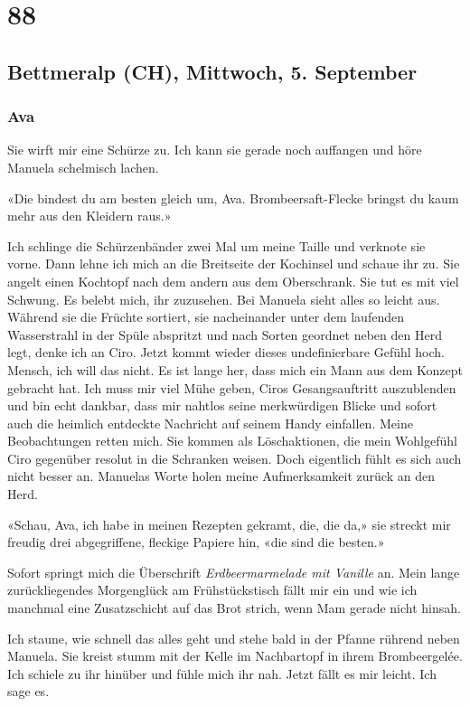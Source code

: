 \chapter{88}

\section{Bettmeralp (CH), Mittwoch, 5. 
September}

\subsection{Ava}

Sie wirft mir eine Schürze zu. Ich kann sie gerade noch auffangen und
höre Manuela schelmisch lachen.

«Die bindest du am besten gleich um, Ava. Brombeersaft-Flecke bringst du
kaum mehr aus den Kleidern raus.»

Ich schlinge die Schürzenbänder zwei Mal um meine Taille und verknote
sie vorne. Dann lehne ich mich an die Breitseite der Kochinsel und
schaue ihr zu. Sie angelt einen Kochtopf nach dem andern aus dem
Oberschrank. Sie tut es mit viel Schwung. Es belebt mich, ihr zuzusehen. Bei Manuela sieht alles so
leicht aus. Während sie die Früchte sortiert, sie nacheinander unter dem
laufenden Wasserstrahl in der Spüle abspritzt und nach Sorten geordnet
neben den Herd legt, denke ich an Ciro.
Jetzt kommt wieder dieses undefinierbare Gefühl hoch. Mensch, ich will das
nicht. Es ist lange her, dass mich ein Mann aus dem Konzept gebracht
hat. Ich muss mir viel Mühe geben, Ciros Gesangsauftritt auszublenden
und bin echt dankbar, dass mir nahtlos seine merkwürdigen Blicke und
sofort auch die heimlich entdeckte Nachricht auf seinem Handy einfallen.
Meine Beobachtungen retten mich. Sie kommen als Löschaktionen, die mein
Wohlgefühl Ciro gegenüber resolut in die Schranken weisen. Doch eigentlich
fühlt es sich auch nicht besser an. Manuelas Worte holen meine
Aufmerksamkeit zurück an den Herd.

«Schau, Ava, ich habe in meinen Rezepten gekramt, die, die da,» sie
streckt mir freudig drei abgegriffene, fleckige Papiere hin, «die sind die
besten.»

Sofort springt mich die Überschrift \emph{Erdbeermarmelade mit Vanille}
an. Mein lange zurückliegendes Morgenglück am Frühstückstisch fällt mir
ein und wie ich manchmal eine Zusatzschicht auf das Brot strich, wenn
Mam gerade nicht hinsah.

Ich staune, wie schnell das alles geht und stehe bald in der Pfanne
rührend neben Manuela. Sie kreist stumm mit der Kelle im Nachbartopf in
ihrem Brombeergelée. Ich schiele zu ihr hinüber und fühle mich ihr nah.
Jetzt fällt es mir leicht. Ich sage es.

